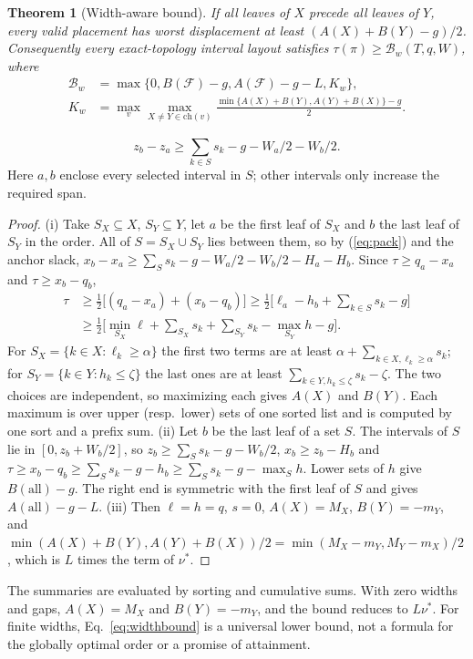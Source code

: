 \documentclass{vgtc}                %
\newtheorem{theorem}{Theorem}\newtheorem{lemma}{Lemma}\newtheorem{proposition}{Proposition}
\begin{document}
\begin{theorem}[Width-aware bound]\label{thm:width}
If all leaves of $X$ precede all leaves of $Y$, every valid placement has worst displacement at least $(A(X)+B(Y)-g)/2$. Consequently every exact-topology interval layout satisfies $\tau(\pi)\ge\mathcal{B}_w(T,q,W)$, where
\begin{equation}\label{eq:widthbound}
\begin{aligned}
\mathcal{B}_w&=\max\{0,B(\mathcal{F})-g,A(\mathcal{F})-g-L,K_w\},\\
K_w&=\max_v\max_{X\ne Y\in\mathrm{ch}(v)}
 \frac{\min\{A(X)+B(Y),A(Y)+B(X)\}-g}{2}.
\end{aligned}
\end{equation}
\end{theorem}
\begin{equation}\label{eq:pack}
 z_b-z_a\ge\sum_{k\in S}s_k-g-W_a/2-W_b/2.
\end{equation}
Here $a,b$ enclose every selected interval in $S$; other intervals only increase the required span.
\begin{proof}
(i) Take $S_X\subseteq X$, $S_Y\subseteq Y$, let $a$ be the first leaf of $S_X$ and $b$ the last leaf of $S_Y$ in the order. All of $S=S_X\cup S_Y$ lies between them, so by (\ref{eq:pack}) and the anchor slack, $x_b-x_a\ge\sum_S s_k-g-W_a/2-W_b/2-H_a-H_b$. Since $\tau\ge q_a-x_a$ and $\tau\ge x_b-q_b$,
\begin{align*}
\tau&\ge\tfrac12\big[(q_a-x_a)+(x_b-q_b)\big]\ge\tfrac12\Big[\ell_a-h_b+\sum_{k\in S}s_k-g\Big]\\
&\ge\tfrac12\Big[\min_{S_X}\ell+\sum_{S_X}s_k+\sum_{S_Y}s_k-\max_{S_Y}h-g\Big].
\end{align*}
For $S_X=\{k\in X:\ell_k\ge\alpha\}$ the first two terms are at least $\alpha+\sum_{k\in X,\ell_k\ge\alpha}s_k$; for $S_Y=\{k\in Y:h_k\le\zeta\}$ the last ones are at least $\sum_{k\in Y,h_k\le\zeta}s_k-\zeta$. The two choices are independent, so maximizing each gives $A(X)$ and $B(Y)$. Each maximum is over upper (resp.\ lower) sets of one sorted list and is computed by one sort and a prefix sum.
(ii) Let $b$ be the last leaf of a set $S$. The intervals of $S$ lie in $[0,z_b+W_b/2]$, so $z_b\ge\sum_S s_k-g-W_b/2$, $x_b\ge z_b-H_b$ and $\tau\ge x_b-q_b\ge\sum_S s_k-g-h_b\ge\sum_S s_k-g-\max_S h$. Lower sets of $h$ give $B(\mathrm{all})-g$. The right end is symmetric with the first leaf of $S$ and gives $A(\mathrm{all})-g-L$.
(iii) Then $\ell=h=q$, $s=0$, $A(X)=M_X$, $B(Y)=-m_Y$, and $\min(A(X)+B(Y),A(Y)+B(X))/2=\min(M_X-m_Y,M_Y-m_X)/2$, which is $L$ times the term of $\nu^*$.
\end{proof}
The summaries are evaluated by sorting and cumulative sums. With zero widths and gaps, $A(X)=M_X$ and $B(Y)=-m_Y$, and the bound reduces to $L\nu^*$. For finite widths, Eq.~\ref{eq:widthbound} is a universal lower bound, not a formula for the globally optimal order or a promise of attainment.
\end{document}
